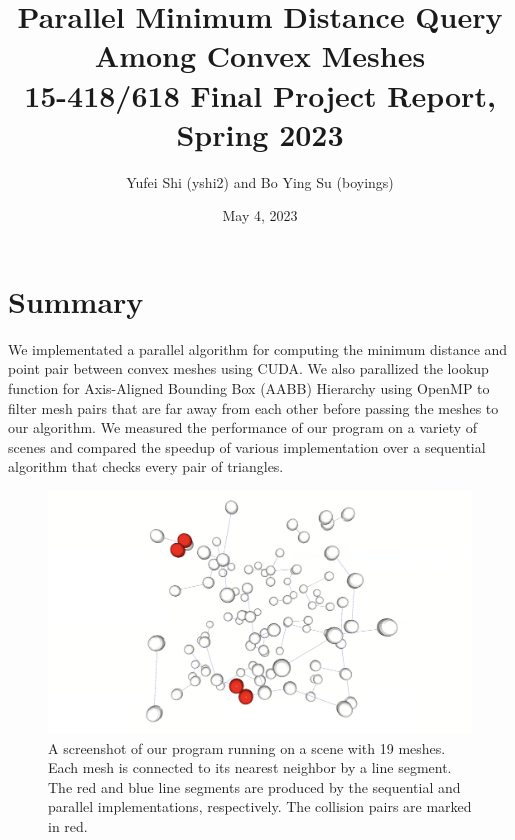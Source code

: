 \documentclass[12pt,fleqn]{article}
\title{%
    Parallel Minimum Distance Query Among Convex Meshes \\
    \Large 15-418/618 Final Project Report, Spring 2023}
\author{Yufei Shi (yshi2) and Bo Ying Su (boyings)}
\date{May 4, 2023}
\begin{document}
\maketitle



\section{Summary}
We implementated a parallel algorithm for computing the minimum distance and point pair between convex meshes using CUDA. We also parallized the lookup function for Axis-Aligned Bounding Box (AABB) Hierarchy using OpenMP to filter mesh pairs that are far away from each other before passing the meshes to our algorithm.
We measured the performance of our program on a variety of scenes and compared the speedup of various implementation over a sequential algorithm that checks every pair of triangles.


\begin{figure}[ht!]
    \centering
    \includegraphics[width=1.0\textwidth]{figs/cover_new.png}
    \caption{%
            A screenshot of our program running on a scene with 19 meshes.
            Each mesh is connected to its nearest neighbor by a line segment.
            The red and blue line segments are produced by the sequential and parallel implementations, respectively.
            The collision pairs are marked in red.}
\end{figure}



\end{document}
